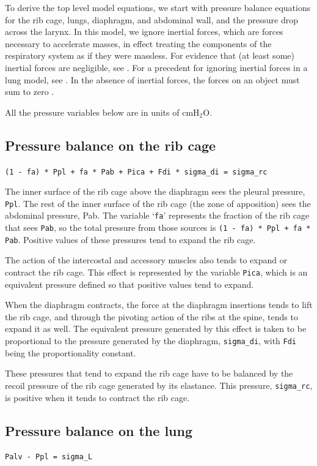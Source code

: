 \documentclass[12pt,openany,oneside]{book}
\newcommand{\ticode}[1]{\texttt{#1}}
\newcommand{\tisamp}[1]{`\texttt{#1}'}
\begin{document}
To derive the top level model equations, we start with pressure
balance equations for the rib cage, lungs, diaphragm, and abdominal
wall, and the pressure drop across the larynx.  In this model, we
ignore inertial forces, which are forces necessary to accelerate
masses, in effect treating the components of the respiratory system as
if they were massless.  For evidence that (at least some) inertial
forces are negligible, see \citet{Mead01091956}.  For a precedent for
ignoring inertial forces in a lung model, see \citet{Younes01101981}.
In the absence of inertial forces, the forces on an object must sum to
zero \citep{Newton1687}.

All the pressure variables below are in units of cmH$_2$O.

\subsection{Pressure balance on the rib cage}
\ticode{(1 - fa) * Ppl + fa * Pab + Pica + Fdi * sigma\_di = sigma\_rc}

The inner surface of the rib cage above the diaphragm sees the pleural
pressure, \ticode{Ppl}.  The rest of the inner surface of the rib cage
(the zone of apposition) sees the abdominal pressure, Pab.  The
variable \tisamp{fa} represents the fraction of the rib cage that
sees \ticode{Pab}, so the total pressure from those sources is
\ticode{(1 - fa) * Ppl + fa * Pab}.  Positive values of these
pressures tend to expand the rib cage.

The action of the intercostal and accessory muscles also tends to
expand or contract the rib cage.  This effect is represented by the
variable \ticode{Pica}, which is an equivalent pressure defined so
that positive values tend to expand.

When the diaphragm contracts, the force at the diaphragm insertions
tends to lift the rib cage, and through the pivoting action of the
ribs at the spine, tends to expand it as well.  The equivalent
pressure generated by this effect is taken to be proportional to the
pressure generated by the diaphragm, \ticode{sigma\_di}, with
\ticode{Fdi} being the proportionality constant.

These pressures that tend to expand the rib cage have to be balanced
by the recoil pressure of the rib cage generated by its elastance.
This pressure, \ticode{sigma\_rc}, is positive when it tends to
contract the rib cage.

\subsection{Pressure balance on the lung}
\ticode{Palv - Ppl = sigma\_L}
\end{document}
